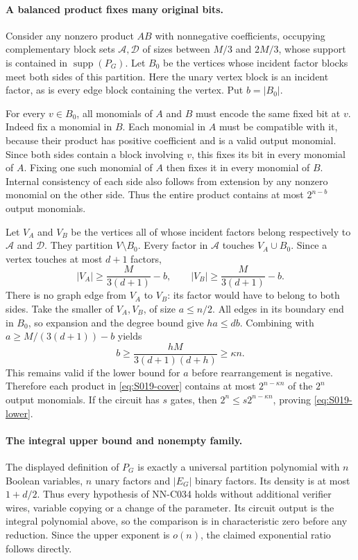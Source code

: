\paragraph{A balanced product fixes many original bits.}
Consider any nonzero product $AB$ with nonnegative coefficients,
occupying complementary block sets $\mathcal A,\mathcal D$ of
sizes between $M/3$ and $2M/3$, whose support is contained in
$\operatorname{supp}(P_G)$. Let $B_0$ be the vertices whose
incident factor blocks meet both sides of this partition.
Here the unary vertex block is an incident factor, as is every
edge block containing the vertex. Put $b=|B_0|$.

For every $v\in B_0$, all monomials of $A$ and $B$ must
encode the same fixed bit at $v$. Indeed fix a monomial in
$B$. Each monomial in $A$ must be compatible with it, because
their product has positive coefficient and is a valid output
monomial. Since both sides contain a block involving $v$,
this fixes its bit in every monomial of $A$. Fixing one such
monomial of $A$ then fixes it in every monomial of $B$.
Internal consistency of each side also follows from extension
by any nonzero monomial on the other side. Thus the entire
product contains at most $2^{n-b}$ output monomials.

Let $V_A$ and $V_B$ be the vertices all of whose incident
factors belong respectively to $\mathcal A$ and $\mathcal D$.
They partition $V\setminus B_0$. Every factor in
$\mathcal A$ touches $V_A\cup B_0$. Since a vertex touches
at most $d+1$ factors,
\[
 |V_A|\ge\frac{M}{3(d+1)}-b,
 \qquad |V_B|\ge\frac{M}{3(d+1)}-b.
\]
There is no graph edge from $V_A$ to $V_B$: its factor
would have to belong to both sides. Take the smaller of
$V_A,V_B$, of size $a\le n/2$. All edges in its boundary
end in $B_0$, so expansion and the degree bound give
$ha\le db$. Combining with
$a\ge M/(3(d+1))-b$ yields
\[
 b\ge\frac{hM}{3(d+1)(d+h)}\ge\kappa n.
\]
This remains valid if the lower bound for $a$ before
rearrangement is negative. Therefore each product in
\eqref{eq:S019-cover} contains at most $2^{n-\kappa n}$
of the $2^n$ output monomials. If the circuit has $s$ gates,
then $2^n\le s2^{n-\kappa n}$, proving
\eqref{eq:S019-lower}.

\paragraph{The integral upper bound and nonempty family.}
The displayed definition of $P_G$ is exactly a universal
partition polynomial with $n$ Boolean variables, $n$ unary
factors and $|E_G|$ binary factors. Its density is at most
$1+d/2$. Thus every hypothesis of NN-C034 holds without
additional verifier wires, variable copying or a change
of the parameter. Its circuit output is the integral
polynomial above, so the comparison is in characteristic
zero before any reduction. Since the upper exponent is
$o(n)$, the claimed exponential ratio follows directly.

